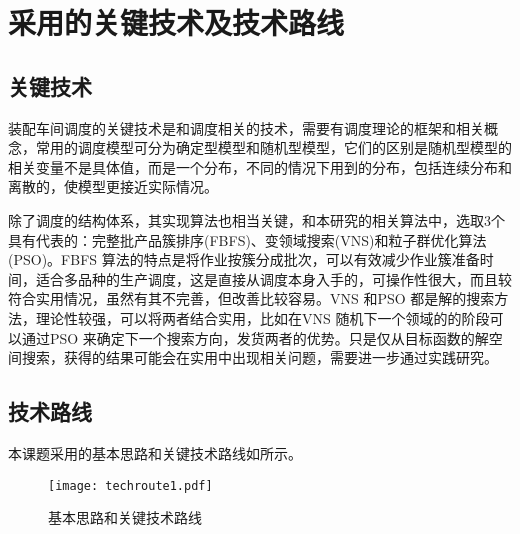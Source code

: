 
\chapter{采用的关键技术及技术路线}
\section{关键技术}
装配车间调度的关键技术是和调度相关的技术，需要有调度理论的框架和相关概念，常用的调度模型可分为确定型模型和随机型模型，它们的区别是随机型模型的相关变量不是具体值，而是一个分布，不同的情况下用到的分布，包括连续分布和离散的，使模型更接近实际情况。

除了调度的结构体系，其实现算法也相当关键，和本研究的相关算法中，选取3个具有代表的：完整批产品簇排序(FBFS)、变领域搜索(VNS)和粒子群优化算法(PSO)。FBFS 算法的特点是将作业按簇分成批次，可以有效减少作业簇准备时间，适合多品种的生产调度，这是直接从调度本身入手的，可操作性很大，而且较符合实用情况，虽然有其不完善，但改善比较容易。VNS 和PSO 都是解的搜索方法，理论性较强，可以将两者结合实用，比如在VNS 随机下一个领域的的阶段可以通过PSO 来确定下一个搜索方向，发货两者的优势。只是仅从目标函数的解空间搜索，获得的结果可能会在实用中出现相关问题，需要进一步通过实践研究。
\section{技术路线}
本课题采用的基本思路和关键技术路线如所示。
\begin{figure}[h]
\centering
\texttt{[image: techroute1.pdf]}
\caption{基本思路和关键技术路线\label{fig:1}}
\end{figure}